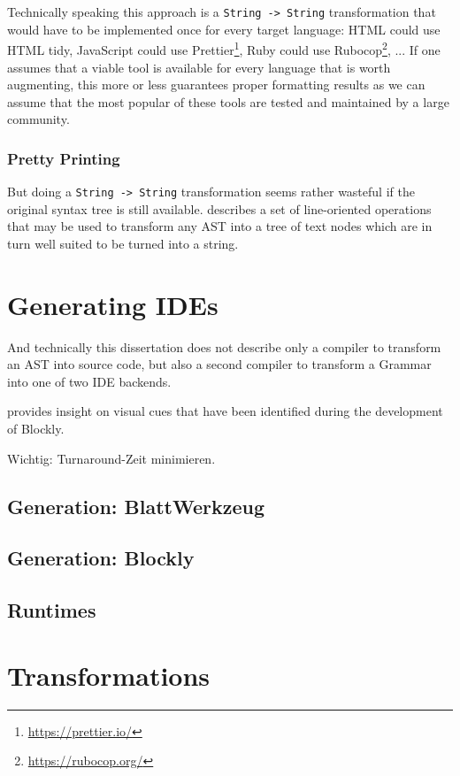 Technically speaking this approach is a \texttt{String -> String} transformation that would have to be implemented once for every target language: HTML could use HTML tidy, JavaScript could use Prettier\footnote{\url{https://prettier.io/}}, Ruby could use Rubocop\footnote{\url{https://rubocop.org/}}, ... If one assumes that a viable tool is available for every language that is worth augmenting, this more or less guarantees proper formatting results as we can assume that the most popular of these tools are tested and maintained by a large community.

\subsubsection{Pretty Printing}

But doing a \texttt{String -> String} transformation seems rather wasteful if the original syntax tree is still available. \cite{wadler_prettier_printer} describes a set of line-oriented operations that may be used to transform any AST into a tree of text nodes which are in turn well suited to be turned into a string.

\section{Generating IDEs}

And technically this dissertation does not describe only a compiler to transform an AST into source code, but also a second compiler to transform a Grammar into one of two IDE backends.

\cite{fraser_ten_2015} provides insight on visual cues that have been identified during the development of Blockly.

Wichtig: Turnaround-Zeit minimieren.

\subsection{Generation: BlattWerkzeug}

\subsection{Generation: Blockly}

\subsection{Runtimes}

\section{Transformations}

